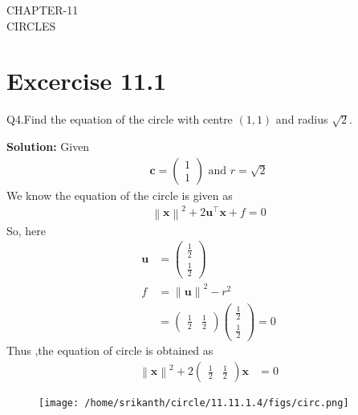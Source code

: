 \documentclass[12pt]{article}
\providecommand{\norm}[1]{\left\lVert#1\right\rVert}
\newcommand{\solution}{\noindent \textbf{Solution: }}
\newcommand{\myvec}[1]{\ensuremath{\begin{pmatrix}#1\end{pmatrix}}}
\let\vec\mathbf
\begin{document}
\begin{center}
\textbf\large{CHAPTER-11 \\ CIRCLES}

\end{center}
\section*{Excercise 11.1}

Q4.Find the equation of the circle with centre $(1,1)$ and radius $\sqrt{2}$.

\solution
Given
\begin{align}
	\vec{c} = \myvec{1\\1} \text{ and } r = \sqrt{2}
\end{align}
We know the equation of the circle is given as
\begin{align}
	\norm{\vec{x}}^{2} + 2\vec{u}^{\top}\vec{x} + f = 0
\end{align}
So, here
\begin{align}
	\vec{u} &= \myvec{\frac{1}{2}\\[2pt]\frac{1}{2}}\\
	f &= \norm{\vec{u}}^2 - r^2\\
	  &= \myvec{\frac{1}{2}&\frac{1}{2}}\myvec{\frac{1}{2}\\[2pt]\frac{1}{2}} = 0
\end{align}
Thus ,the equation of circle is obtained as
\begin{align}
	\norm{\vec{x}}^2 + 2\myvec{\frac{1}{2}&\frac{1}{2}}\vec{x} &= 0       		       
\end{align}	
\begin{figure}[!h]
	\begin{center} 
	  \texttt{[image: /home/srikanth/circle/11.11.1.4/figs/circ.png]}
	\end{center}
\caption{}
\label{fig:Fig1}
\end{figure}
\end{document}
